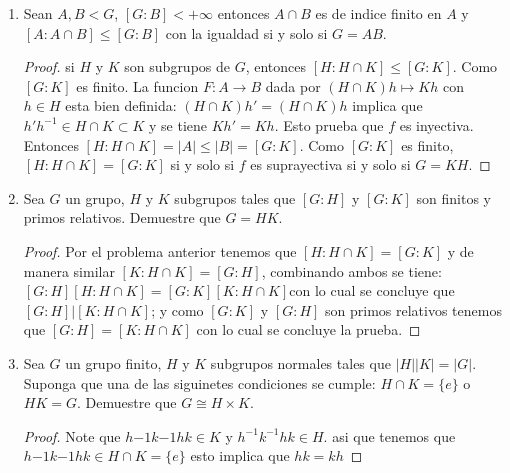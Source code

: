 \documentclass{article}
\theoremstyle{break}
\begin{document}
\begin{enumerate}
\begin{proof}
			A demas $f$ es suprayectiva. En efecto, $\mbox{Im}(f)\cong\mathbb{Z}/\mbox{Ker}(f)=\mathbb{Z}/nm\mathbb{Z}=\mathbb{Z}_{nm}$ el cual tiene exactamente $nm$ elementos, tantos como $mathbb{Z}_n\times\mathbb{Z}_m$. Entonces $f$ es un isomorfismo de grupos.
			
			Si $n=\prod_{i=1}^{k}{p_{i}^{e_i}}$ es la factorizacion de $n$ en primos, por induccion se cumple para n=2, suponga que se cumple para n=k, entonces $\mathbb{Z}_{p^{e_1}}\times...\times\mathbb{Z}_{p^{e_k}}\times\mathbb{Z}_{p^{e_{k+1}}}$ es isomorfo a $\mathbb{Z}_n$. con lo cual termina la prueba.
		\end{proof}
		
		\item Sean $A,B<G$, $[G:B]<+\infty$ entonces $A\cap B$ es de indice finito en $A$ y $[A:A\cap B]\leq [G:B]$ con la igualdad si y solo si $G=AB$.
		
		\begin{proof}
			si $H$ y $K$ son subgrupos de $G$, entonces $[H:H\cap K]\leq [G:K]$. Como $[G:K]$ es finito. La funcion $F:A\rightarrow B$ dada por $(H\cap K)h\mapsto Kh$ con $h\in H$ esta bien definida: $(H\cap K)h'=(H\cap K)h$ implica que $h'h^{-1}\in H\cap K\subset K$ y se tiene $Kh'=Kh$. Esto prueba que $f$ es inyectiva. Entonces $[H:H\cap K]=|A|\leq |B|=[G:K]$. Como $[G:K]$ es finito,  $[H:H\cap K]=[G:K]$ si y solo si $f$ es suprayectiva si y solo si $G=KH$.
		\end{proof}
		
		\item Sea $G$ un grupo, $H$ y $K$ subgrupos tales que $[G:H]$ y $[G:K]$ son finitos y primos relativos. Demuestre que $G=HK$.
		
		\begin{proof}
			Por el problema anterior tenemos que $[H:H\cap K]=[G:K]$ y de manera similar $[K:H\cap K]=[G:H]$, combinando ambos se tiene: $[G:H][H:H\cap K]=[G:K][K:H\cap K]$con lo cual se concluye que $[G:H]|[K:H\cap K]$; y como $[G:K]$ y $[G:H]$ son primos relativos tenemos que $[G:H]=[K:H\cap K]$ con lo cual se concluye la prueba.
		\end{proof}
		
		\item Sea $G$ un grupo finito, $H$ y $K$ subgrupos normales tales que $|H||K|=|G|$. Suponga que una de las siguinetes condiciones se cumple: $H\cap K=\{e\}$ o $HK=G$. Demuestre que $G\cong H\times K$.
		
		\begin{proof}
		Note que $h{-1}k{-1}hk\in K$ y $h^{-1}k^{-1}hk\in H$. asi que tenemos que $h{-1}k{-1}hk\in H\cap K=\{e\}$ esto implica que $hk=kh$
			

\end{proof}
\end{enumerate}
\end{document}
